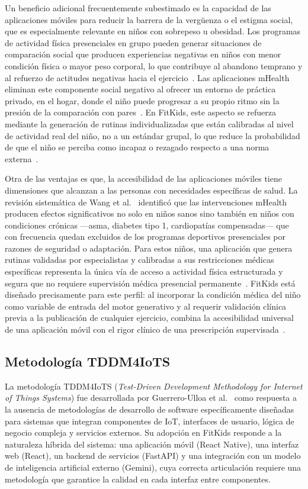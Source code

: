 					Un beneficio adicional frecuentemente subestimado es la capacidad de las aplicaciones móviles para reducir la barrera de la vergüenza o el estigma social, que es especialmente relevante en niños con sobrepeso u obesidad. Los programas de actividad física presenciales en grupo pueden generar situaciones de comparación social que producen experiencias negativas en niños con menor condición física o mayor peso corporal, lo que contribuye al abandono temprano y al refuerzo de actitudes negativas hacia el ejercicio~\cite{MateoOrcajada2024}. Las aplicaciones mHealth eliminan este componente social negativo al ofrecer un entorno de práctica privado, en el hogar, donde el niño puede progresar a su propio ritmo sin la presión de la comparación con pares~\cite{Direito2017}. En FitKids, este aspecto se refuerza mediante la generación de rutinas individualizadas que están calibradas al nivel de actividad real del niño, no a un estándar grupal, lo que reduce la probabilidad de que el niño se perciba como incapaz o rezagado respecto a una norma externa~\cite{WangJun2024}.
					
					Otra de las ventajas es que, la accesibilidad de las aplicaciones móviles tiene dimensiones que alcanzan a las personas con necesidades específicas de salud. La revisión sistemática de Wang et al.~\cite{WangJun2024} identificó que las intervenciones mHealth producen efectos significativos no solo en niños sanos sino también en niños con condiciones crónicas ---asma, diabetes tipo 1, cardiopatías compensadas--- que con frecuencia quedan excluidos de los programas deportivos presenciales por razones de seguridad o adaptación. Para estos niños, una aplicación que genera rutinas validadas por especialistas y calibradas a sus restricciones médicas específicas representa la única vía de acceso a actividad física estructurada y segura que no requiere supervisión médica presencial permanente~\cite{WangJun2024,Zaleski2026}. FitKids está diseñado precisamente para este perfil: al incorporar la condición médica del niño como variable de entrada del motor generativo y al requerir validación clínica previa a la publicación de cualquier ejercicio, combina la accesibilidad universal de una aplicación móvil con el rigor clínico de una prescripción supervisada~\cite{Yim2024,Zaleski2026}.


			\subsection{Metodología TDDM4IoTS}
				La metodología TDDM4IoTS (\textit{Test-Driven Development Methodology for Internet of Things Systems}) fue desarrollada por Guerrero-Ulloa et al.~\cite{GuerreroUlloa2024} como respuesta a la ausencia de metodologías de desarrollo de software específicamente diseñadas para sistemas que integran componentes de IoT, interfaces de usuario, lógica de negocio compleja y servicios externos. Su adopción en FitKids responde a la naturaleza híbrida del sistema: una aplicación móvil (React Native), una interfaz web (React), un backend de servicios (FastAPI) y una integración con un modelo de inteligencia artificial externo (Gemini), cuya correcta articulación requiere una metodología que garantice la calidad en cada interfaz entre componentes.
				
